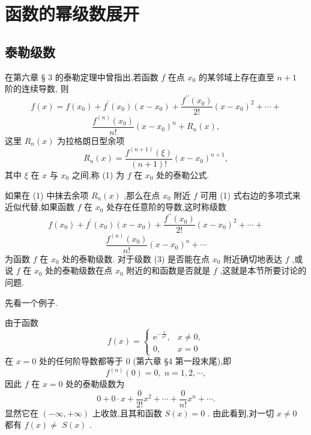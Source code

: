 \section{函数的幂级数展开}

\subsection{泰勒级数}

在第六章 § 3 的泰勒定理中曾指出,若函数 \(f\) 在点 \({x}_{0}\) 的某邻域上存在直至 \(n + 1\) 阶的连续导数, 则
\[
f\left( x\right)  = f\left( {x}_{0}\right)  + {f}^{\prime }\left( {x}_{0}\right) \left( {x - {x}_{0}}\right)  + \frac{{f}^{\prime \prime }\left( {x}_{0}\right) }{2!}{\left( x - {x}_{0}\right) }^{2} + \cdots  +
\]
\[
\frac{{f}^{\left( n\right) }\left( {x}_{0}\right) }{n!}{\left( x - {x}_{0}\right) }^{n} + {R}_{n}\left( x\right) , \tag{1}
\]
这里 \({R}_{n}\left( x\right)\) 为拉格朗日型余项
\[
{R}_{n}\left( x\right)  = \frac{{f}^{\left( n + 1\right) }\left( \xi \right) }{\left( {n + 1}\right) !}{\left( x - {x}_{0}\right) }^{n + 1}, \tag{2}
\]
其中 \(\xi\) 在 \(x\) 与 \({x}_{0}\) 之间,称 (1) 为 \(f\) 在 \({x}_{0}\) 处的泰勒公式.

如果在 (1) 中抹去余项 \({R}_{n}\left( x\right)\) ,那么在点 \({x}_{0}\) 附近 \(f\) 可用 (1) 式右边的多项式来近似代替,如果函数 \(f\) 在 \({x}_{0}\) 处存在任意阶的导数,这时称级数
\[
f\left( {x}_{0}\right)  + {f}^{\prime }\left( {x}_{0}\right) \left( {x - {x}_{0}}\right)  + \frac{{f}^{\prime \prime }\left( {x}_{0}\right) }{2!}{\left( x - {x}_{0}\right) }^{2} + \cdots  +
\]
\[
\frac{{f}^{\left( n\right) }\left( {x}_{0}\right) }{n!}{\left( x - {x}_{0}\right) }^{n} + \cdots  \tag{3}
\]
为函数 \(f\) 在 \({x}_{0}\) 处的泰勒级数. 对于级数 (3) 是否能在点 \({x}_{0}\) 附近确切地表达 \(f\) ,或说 \(f\) 在 \({x}_{0}\) 处的泰勒级数在点 \({x}_{0}\) 附近的和函数是否就是 \(f\) ,这就是本节所要讨论的问题.

先看一个例子.

\begin{example}

\end{example}
由于函数
\[
f\left( x\right)  = \left\{  \begin{array}{ll} {\mathrm{e}}^{-\frac{1}{{x}^{2}}}, & x \neq  0, \\  0, & x = 0 \end{array}\right.
\]
在 \(x = 0\) 处的任何阶导数都等于 0 (第六章 §4 第一段末尾),即
\[
{f}^{\left( n\right) }\left( 0\right)  = 0,\;n = 1,2,\cdots ,
\]
因此 \(f\) 在 \(x = 0\) 处的泰勒级数为
\[
0 + 0 \cdot  x + \frac{0}{2!}{x}^{2} + \cdots  + \frac{0}{n!}{x}^{n} + \cdots .
\]
显然它在 \(\left( {-\infty , + \infty }\right)\) 上收敛,且其和函数 \(S\left( x\right)  = 0\) . 由此看到,对一切 \(x \neq  0\) 都有 \(f\left( x\right)  \neq\)  \(S\left( x\right)\) .

